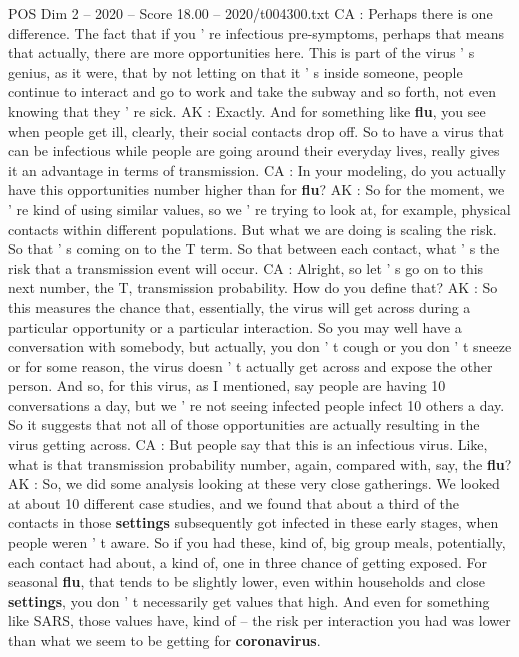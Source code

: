\begin{textsample}{POS Dim 2 – 2020 – Score 18.00 – 2020/t004300.txt}
CA : Perhaps there is one difference.
The fact that if you ' re infectious pre-symptoms, perhaps that means that actually, there are more opportunities here.
This is part of the virus ' s genius, as it were, that by not letting on that it ' s inside someone, people continue to interact and go to work and take the subway and so forth, not even knowing that they ' re sick.
AK : Exactly.
And for something like \textbf{flu}, you see when people get ill, clearly, their social contacts drop off.
So to have a virus that can be infectious while people are going around their everyday lives, really gives it an advantage in terms of transmission.
CA : In your modeling, do you actually have this opportunities number higher than for \textbf{flu}?
AK : So for the moment, we ' re kind of using similar values, so we ' re trying to look at, for example, physical contacts within different populations.
But what we are doing is scaling the risk.
So that ' s coming on to the T term.
So that between each contact, what ' s the risk that a transmission event will occur.
CA : Alright, so let ' s go on to this next number, the T, transmission probability.
How do you define that?
AK : So this measures the chance that, essentially, the virus will get across during a particular opportunity or a particular interaction.
So you may well have a conversation with somebody, but actually, you don ' t cough or you don ' t sneeze or for some reason, the virus doesn ' t actually get across and expose the other person.
And so, for this virus, as I mentioned, say people are having 10 conversations a day, but we ' re not seeing infected people infect 10 others a day.
So it suggests that not all of those opportunities are actually resulting in the virus getting across.
CA : But people say that this is an infectious virus.
Like, what is that transmission probability number, again, compared with, say, the \textbf{flu}?
AK : So, we did some analysis looking at these very close gatherings.
We looked at about 10 different case studies, and we found that about a third of the contacts in those \textbf{settings} subsequently got infected in these early stages, when people weren ' t aware.
So if you had these, kind of, big group meals, potentially, each contact had about, a kind of, one in three chance of getting exposed.
For seasonal \textbf{flu}, that tends to be slightly lower, even within households and close \textbf{settings}, you don ' t necessarily get values that high.
And even for something like SARS, those values have, kind of -- the risk per interaction you had was lower than what we seem to be getting for \textbf{coronavirus}.

\end{textsample}
